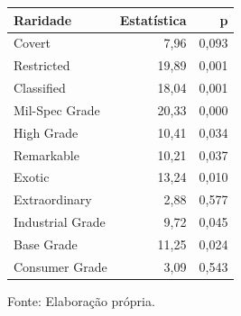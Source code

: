 \begingroup
\setlength{}
\setlength{}
\fontsize{12.0pt}{14.4pt}\selectfont

\setlength{\LTpost}{0mm}
\begin{longtable}{@{\extracolsep{\fill}}lrr}

\toprule
\textbf{Raridade} & \textbf{Estatística} & \textbf{p} \\ 
\midrule\addlinespace[2.5pt]
Covert & 7,96 & 0,093 \\
Restricted & 19,89 & 0,001 \\
Classified & 18,04 & 0,001 \\
Mil-Spec Grade & 20,33 & 0,000 \\
High Grade & 10,41 & 0,034 \\
Remarkable & 10,21 & 0,037 \\
Exotic & 13,24 & 0,010 \\
Extraordinary & 2,88 & 0,577 \\
Industrial Grade & 9,72 & 0,045 \\
Base Grade & 11,25 & 0,024 \\
Consumer Grade & 3,09 & 0,543 \\
\bottomrule
\end{longtable}
\begin{minipage}{\linewidth}
Fonte: Elaboração própria.\\
\end{minipage}
\endgroup
